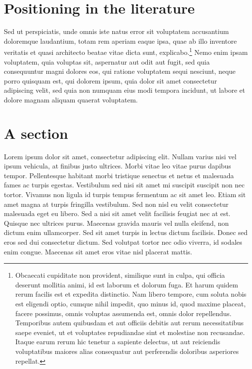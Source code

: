 \section{Positioning in the literature} 

Sed ut perspiciatis, unde omnis iste natus error sit voluptatem accusantium doloremque laudantium, totam rem aperiam eaque ipsa, quae ab illo inventore veritatis et quasi architecto beatae vitae dicta sunt, explicabo.\footnote{Obcaecati cupiditate non provident, similique sunt in culpa, qui officia deserunt mollitia animi, id est laborum et dolorum fuga. Et harum quidem rerum facilis est et expedita distinctio. Nam libero tempore, cum soluta nobis est eligendi optio, cumque nihil impedit, quo minus id, quod maxime placeat, facere possimus, omnis voluptas assumenda est, omnis dolor repellendus. Temporibus autem quibusdam et aut officiis debitis aut rerum necessitatibus saepe eveniet, ut et voluptates repudiandae sint et molestiae non recusandae. Itaque earum rerum hic tenetur a sapiente delectus, ut aut reiciendis voluptatibus maiores alias consequatur aut perferendis doloribus asperiores repellat.} Nemo enim ipsam voluptatem, quia voluptas sit, aspernatur aut odit aut fugit, sed quia consequuntur magni dolores eos, qui ratione voluptatem sequi nesciunt, neque porro quisquam est, qui dolorem ipsum, quia dolor sit amet consectetur adipiscing velit, sed quia non numquam eius modi tempora incidunt, ut labore et dolore magnam aliquam quaerat voluptatem.

\section{A section} 

Lorem ipsum dolor sit amet, consectetur adipiscing elit. Nullam varius nisi vel ipsum vehicula, at finibus justo ultrices. Morbi vitae leo vitae purus dapibus tempor. Pellentesque habitant morbi tristique senectus et netus et malesuada fames ac turpis egestas. Vestibulum sed nisi sit amet mi suscipit suscipit non nec tortor. Vivamus non ligula id turpis tempus fermentum ac sit amet leo. Etiam sit amet magna at turpis fringilla vestibulum. Sed non nisl eu velit consectetur malesuada eget eu libero. Sed a nisi sit amet velit facilisis feugiat nec at est. Quisque nec ultrices purus. Maecenas gravida mauris vel nulla eleifend, non dictum enim ullamcorper. Sed sit amet turpis in lectus dictum facilisis. Donec sed eros sed dui consectetur dictum. Sed volutpat tortor nec odio viverra, id sodales enim congue. Maecenas sit amet eros vitae nisl placerat mattis.

